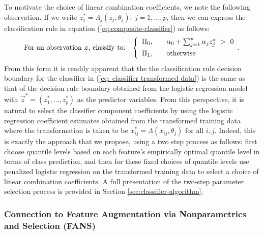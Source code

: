 To motivate the choice of linear combination coefficients, we note the following
observation.  If we write
$z_j^{*} = \Lambda_j (z_j, \theta_j);~ j = 1, \dots, p$, then we can express the
classification rule in equation (\ref{eq:composite-classifier}) as follows:
\begin{equation}
  \label{eq: classifier transformed data}
  \text{For an observation $\vec{z}$, classify to:} \hspace{3mm} \left\{ 
    \begin{array}{lcl}
      \Pi_0, & & \alpha_0 + \sum_{j = 1}^p \alpha_j z_j^{*} ~>~ 0 \\[1ex]
      \Pi_1, & & \text{otherwise} \\[0ex]
    \end{array} .
  \right.
\end{equation}
From this form it is readily apparent that the the classification rule decision
boundary for the classifier in (\ref{eq: classifier transformed data}) is the
same as that of the decision rule boundary obtained from the logistic regression
model with $\vec{z}^{*} = (z_1^{*}, \dots, z_p^{*})$ as the predictor variables.
From this perspective, it is natural to select the classifier component
coefficients by using the logistic regression coefficient estimates obtained
from the transformed training data where the transformation is taken to be
$x_{ij}^{*} = \Lambda(x_{ij}, \theta_j)$ for all $i, j$.  Indeed, this is
exactly the approach that we propose, using a two step process as follows: first
choose quantile levels based on each feature's empirically optimal quantile
level in terms of class prediction, and then for these fixed choices of quantile
levels use penalized logistic regression on the transformed training data to
select a choice of linear combination coefficients.  A full presentation of the
two-step parameter selection process is provided in Section
\ref{sec:classifier-algorithm}.




\subsubsection{Connection to Feature Augmentation via Nonparametrics and
  Selection (FANS)}
\label{sec:similarites-to-fans}

